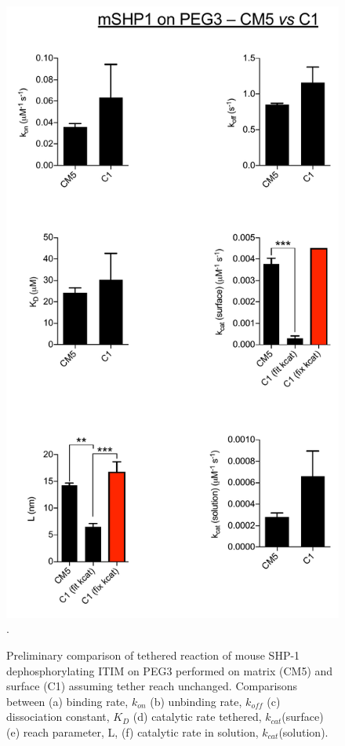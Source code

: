 \documentclass[../../AdvancementSummary.tex]{subfiles}
\begin{document}
\begin{figure}[H]
	\begin{center}
		\includegraphics[scale=0.5]{ResultsFigures/ExperimentalDataPlots/mSHP1_on_PEG3_CM5_vs_C1.pdf}. 
	\end{center}
	\caption{Preliminary comparison of tethered reaction of mouse SHP-1 dephosphorylating ITIM on PEG3 performed on matrix (CM5) and surface (C1) assuming tether reach unchanged. Comparisons between (a) binding rate, $k_{on}$ (b) unbinding rate, $k_{off}$ (c) dissociation constant, $K_D$ (d) catalytic rate tethered, $k_{cat}$(surface) (e) reach parameter, L, (f) catalytic rate in solution, $k_{cat}$(solution). \label{fig: PEG3Data}}
\end{figure}
\end{document}
